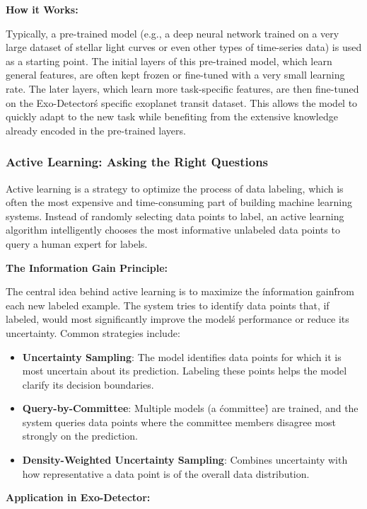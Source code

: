 \documentclass{article}
\begin{document}
\textbf{How it Works:}

Typically, a pre-trained model (e.g., a deep neural network trained on a very large dataset of stellar light curves or even other types of time-series data) is used as a starting point. The initial layers of this pre-trained model, which learn general features, are often kept frozen or fine-tuned with a very small learning rate. The later layers, which learn more task-specific features, are then fine-tuned on the Exo-Detector\'s specific exoplanet transit dataset. This allows the model to quickly adapt to the new task while benefiting from the extensive knowledge already encoded in the pre-trained layers.

\subsubsection{Active Learning: Asking the Right Questions}

Active learning is a strategy to optimize the process of data labeling, which is often the most expensive and time-consuming part of building machine learning systems. Instead of randomly selecting data points to label, an active learning algorithm intelligently chooses the most informative unlabeled data points to query a human expert for labels.

\textbf{The Information Gain Principle:}

The central idea behind active learning is to maximize the \'information gain\' from each new labeled example. The system tries to identify data points that, if labeled, would most significantly improve the model\'s performance or reduce its uncertainty. Common strategies include:

\begin{itemize}
    \item \textbf{Uncertainty Sampling}: The model identifies data points for which it is most uncertain about its prediction. Labeling these points helps the model clarify its decision boundaries.
    \item \textbf{Query-by-Committee}: Multiple models (a \'committee\') are trained, and the system queries data points where the committee members disagree most strongly on the prediction.
    \item \textbf{Density-Weighted Uncertainty Sampling}: Combines uncertainty with how representative a data point is of the overall data distribution.
\end{itemize}

\textbf{Application in Exo-Detector:}
\end{document}
